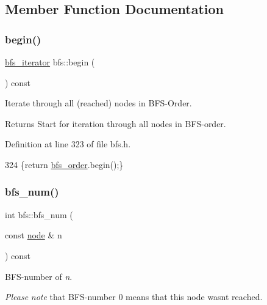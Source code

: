 \subsection{Member Function Documentation}
\mbox{\label{classbfs_aff214e6d33f7f2bbd899cf335540def9}} 
\subsubsection{\texorpdfstring{begin()}{begin()}}
{\footnotesize\ttfamily \mbox{\hyperlink{classbfs_a1035f068a96de0370789ec315aef4f73}{bfs\+\_\+iterator}} bfs\+::begin (\begin{DoxyParamCaption}{ }\end{DoxyParamCaption}) const\hspace{0.3cm}{\ttfamily [inline]}}



Iterate through all (reached) nodes in B\+F\+S-\/\+Order. 

\begin{DoxyReturn}{Returns}
Start for iteration through all nodes in B\+F\+S-\/order. 
\end{DoxyReturn}


Definition at line 323 of file bfs.\+h.


\begin{DoxyCode}
324     \{\textcolor{keywordflow}{return} \mbox{\hyperlink{classbfs_a2596d2cf52f6e7922fd94ce1adde760e}{bfs\_order}}.begin();\}
\end{DoxyCode}
\mbox{\label{classbfs_a6205cc191bc0bedf1ff9d74af0925735}} 
\subsubsection{\texorpdfstring{bfs\+\_\+num()}{bfs\_num()}}
{\footnotesize\ttfamily int bfs\+::bfs\+\_\+num (\begin{DoxyParamCaption}\item[{const \mbox{\hyperlink{classnode}{node}} \&}]{n }\end{DoxyParamCaption}) const\hspace{0.3cm}{\ttfamily [inline]}}



B\+F\+S-\/number of {\itshape n}. 

{\itshape Please} {\itshape note} that B\+F\+S-\/number 0 means that this node wasn\textquotesingle{}t reached.



